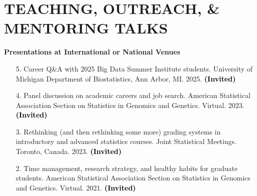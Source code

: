 \documentclass[margin]{res}
\newenvironment{benumerate}[1]{
    \let\oldItem\item
    \def\item{\addtocounter{enumi}{-2}\oldItem}
    
    \begin{enumerate}
    \setcounter{enumi}{#1}
    \addtocounter{enumi}{1}
}{
    \end{enumerate}
}
\newcommand{\annotate}[1]{\textcolor{black}{\textbf{(#1)}}}
\newcommand{\annotateItem}[1]{
	\begin{itemize} \vspace{-0.1cm}
	\item[] 
	\begin{footnotesize}\textcolor{black}{(#1)}\end{footnotesize}
	\end{itemize} \vspace{-0.1cm}
}
\begin{document}
\begin{resume}
\begin{itemize}
\end{itemize}




\section{TEACHING, OUTREACH, \& MENTORING  TALKS}

\textbf{Presentations at International or National Venues}

\begin{itemize}

\item[5.] Career Q\&A with 2025 Big Data Summer Institute students. University of Michigan Department of Biostatistics, Ann Arbor, MI. 2025. \annotate{Invited}


\item[4.] Panel discussion on academic careers and job search. 
American Statistical Association Section on Statistics in Genomics and Genetics. Virtual. 2023. 
\annotate{Invited}

\item[3.] Rethinking (and then rethinking some more) grading systems in introductory and advanced statistics courses. 
Joint Statistical Meetings. Toronto, Canada. 2023. 
\annotate{Invited}

\item[2.] Time management, research strategy, and healthy habits for graduate students. 
American Statistical Association Section on Statistics in Genomics and Genetics. Virtual. 2021. 
\annotate{Invited}


\end{itemize}
\end{resume}
\end{document}
